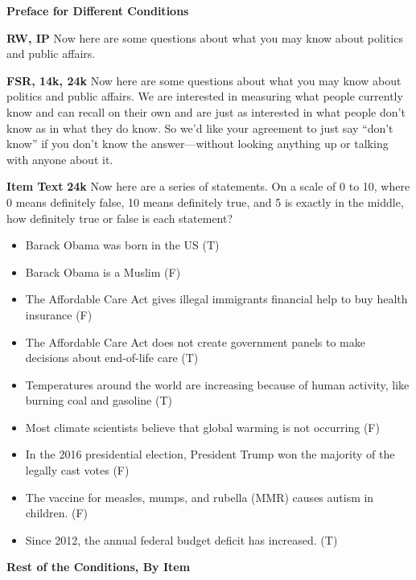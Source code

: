 \textbf{Preface for Different Conditions}

\textbf{RW, IP}\newline
Now here are some questions about what you may know about politics and public affairs.

\textbf{FSR, 14k, 24k}\newline
Now here are some questions about what you may know about politics and public affairs.
We are interested in measuring what people currently know and can recall on their own and are
just as interested in what people don't know as in what they do know. So we'd like your
agreement to just say ``don't know'' if you don't know the answer—without looking anything up
or talking with anyone about it.

\textbf{Item Text}
\textbf{24k}\newline
Now here are a series of statements. On a scale of 0 to 10, where 0 means definitely false,
10 means definitely true, and 5 is exactly in the middle, how definitely true or false is
each statement?

\begin{itemize}
	\item Barack Obama was born in the US (T)
	\item  Barack Obama is a Muslim (F)
	\item  The Affordable Care Act gives illegal immigrants financial help to buy health insurance (F)
	\item  The Affordable Care Act does not create government panels to make decisions about end-of-life care (T)
	\item  Temperatures around the world are increasing because of human activity, like burning coal and gasoline (T)
	\item  Most climate scientists believe that global warming is not occurring (F)
	\item  In the 2016 presidential election, President Trump won the majority of the legally cast votes (F)
	\item  The vaccine for measles, mumps, and rubella (MMR) causes autism in children. (F)
	\item  Since 2012, the annual federal budget deficit has increased. (T)
\end{itemize}

\textbf{Rest of the Conditions, By Item}

